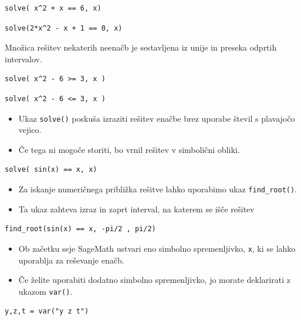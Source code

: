 \begin{verbatim}
solve( x^2 + x == 6, x)
\end{verbatim}

\begin{verbatim}
solve(2*x^2 - x + 1 == 0, x)
\end{verbatim}

Množica rešitev nekaterih neenačb je sestavljena iz unije in preseka odprtih intervalov.

\begin{verbatim}
solve( x^2 - 6 >= 3, x )
\end{verbatim}

\begin{verbatim}
solve( x^2 - 6 <= 3, x )
\end{verbatim}

\begin{itemize}
\item Ukaz \texttt{solve()} poskuša izraziti rešitev enačbe brez uporabe števil s plavajočo vejico.
\item Če tega ni mogoče storiti, bo vrnil rešitev v simbolični obliki.
\end{itemize}

\begin{verbatim}
solve( sin(x) == x, x)
\end{verbatim}

\begin{itemize}
\item Za iskanje numeričnega približka rešitve lahko uporabimo ukaz \texttt{find\_root()}.
\item Ta ukaz zahteva izraz in zaprt interval, na katerem se išče rešitev
\end{itemize}

\begin{verbatim}
find_root(sin(x) == x, -pi/2 , pi/2)
\end{verbatim}

\begin{itemize}
\item Ob začetku seje SageMath ustvari eno simbolno spremenljivko, \texttt{x}, ki se lahko uporablja za reševanje enačb.
\item Če želite uporabiti dodatno simbolno spremenljivko, jo morate deklarirati z ukazom \texttt{var()}.
\end{itemize}

\begin{verbatim}
y,z,t = var("y z t")
\end{verbatim}

